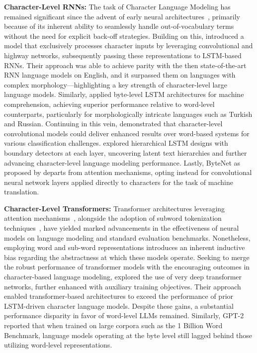 \textbf{Character-Level RNNs:} The task of Character Language Modeling has remained significant since the advent of early neural architectures~\citep{sutskever2011generating,mikolov2012subword,graves2013generating}, primarily because of its inherent ability to seamlessly handle out-of-vocabulary terms without the need for explicit back-off strategies. Building on this, \cite{kim2016character} introduced a model that exclusively processes character inputs by leveraging convolutional and highway networks, subsequently passing these representations to LSTM-based RNNs. Their approach was able to achieve parity with the then state-of-the-art RNN language models on English, and it surpassed them on languages with complex morphology—highlighting a key strength of character-level large language models. Similarly, \cite{kenter2018byte} applied byte-level LSTM architectures for machine comprehension, achieving superior performance relative to word-level counterparts, particularly for morphologically intricate languages such as Turkish and Russian. Continuing in this vein, \cite{zhang2015character} demonstrated that character-level convolutional models could deliver enhanced results over word-based systems for various classification challenges. \citet{chung2019hierarchical} explored hierarchical LSTM designs with boundary detectors at each layer, uncovering latent text hierarchies and further advancing character-level language modeling performance. Lastly, ByteNet as proposed by \cite{kalchbrenner2016neural} departs from attention mechanisms, opting instead for convolutional neural network layers applied directly to characters for the task of machine translation.

\textbf{Character-Level Transformers:} Transformer architectures leveraging attention mechanisms~\citep{vaswani2017attention}, alongside the adoption of subword tokenization techniques~\citep{sennrich-etal-2016-neural}, have yielded marked advancements in the effectiveness of neural models on language modeling and standard evaluation benchmarks. Nonetheless, employing word and sub-word representations introduces an inherent inductive bias regarding the abstractness at which these models operate. Seeking to merge the robust performance of transformer models with the encouraging outcomes in character-based language modeling, \citet{al2019character} explored the use of very deep transformer networks, further enhanced with auxiliary training objectives. Their approach enabled transformer-based architectures to exceed the performance of prior LSTM-driven character language models. Despite these gains, a substantial performance disparity in favor of word-level LLMs remained. Similarly, GPT-2~\citep{radfordgpt2} reported that when trained on large corpora such as the 1 Billion Word Benchmark, language models operating at the byte level still lagged behind those utilizing word-level representations.

